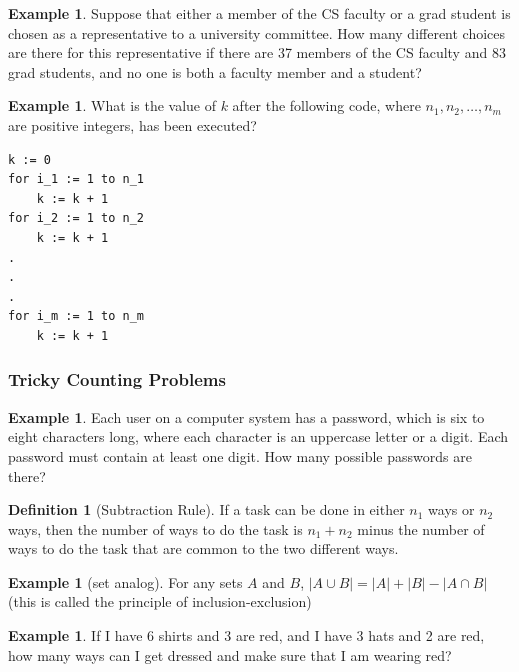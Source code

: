 \documentclass[letterpaper,10pt]{article}
\theoremstyle{plain}
\theoremstyle{definition}
\newtheorem{defn}[thm]{Definition}
\newtheorem{exmp}[thm]{Example}
\theoremstyle{remark}
\begin{document}
\begin{exmp}
    Suppose that either a member of the CS faculty or a grad student is chosen as a representative to a university committee. How many different choices are there for this representative if there are 37 members of the CS faculty and 83 grad students, and no one is both a faculty member and a student?

    \vspace{2cm}
\end{exmp}

\newpage
\begin{exmp}
    What is the value of $k$ after the following code, where $n_1, n_2, \ldots, n_m$ are positive integers, has been executed?

    \begin{verbatim}
k := 0
for i_1 := 1 to n_1
    k := k + 1
for i_2 := 1 to n_2
    k := k + 1
.
.
.
for i_m := 1 to n_m
    k := k + 1
\end{verbatim}
\vspace{2cm}
\end{exmp}
\subsubsection{Tricky Counting Problems}
\begin{exmp}
    Each user on a computer system has a password, which is six to eight characters long, where each character is an uppercase letter or a digit. Each password must contain at least one digit. How many possible passwords are there?
    \vspace{4cm}
\end{exmp}

\begin{defn}[Subtraction Rule]
    If a task can be done in either $n_1$ ways or $n_2$ ways, then the number of ways to do the task is $n_1 + n_2$ minus the number of ways to do the task that are common to the two different ways.
\end{defn}
\begin{exmp}[set analog]
For any sets $A$ and $B$,
$|A\cup B|=|A|+|B|-|A\cap B|$ (this is called the principle of inclusion-exclusion)
\end{exmp}
\begin{exmp}
If I have 6 shirts and 3 are red, and I have 3 hats and 2 are  red, how many ways can I get dressed and make sure that I am wearing red?
\vspace{2cm}
\end{exmp}
\end{document}
